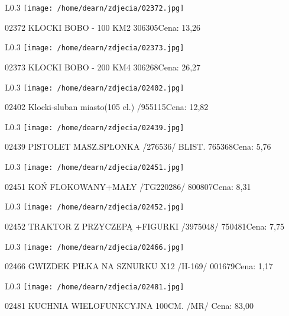 \begin{wrapfigure}{L}{0.3\textwidth}
\texttt{[image: /home/dearn/zdjecia/02372.jpg]}
\end{wrapfigure}
02372 KLOCKI BOBO - 100 KM2                           306305Cena: 13,26\newline
\begin{wrapfigure}{L}{0.3\textwidth}
\texttt{[image: /home/dearn/zdjecia/02373.jpg]}
\end{wrapfigure}
02373 KLOCKI BOBO - 200 KM4                           306268Cena: 26,27\newline
\begin{wrapfigure}{L}{0.3\textwidth}
\texttt{[image: /home/dearn/zdjecia/02402.jpg]}
\end{wrapfigure}
02402 Klocki-sluban miasto(105 el.) /955115Cena: 12,82\newline
\begin{wrapfigure}{L}{0.3\textwidth}
\texttt{[image: /home/dearn/zdjecia/02439.jpg]}
\end{wrapfigure}
02439 PISTOLET MASZ.SPŁONKA /276536/  BLIST.          765368Cena: 5,76\newline
\begin{wrapfigure}{L}{0.3\textwidth}
\texttt{[image: /home/dearn/zdjecia/02451.jpg]}
\end{wrapfigure}
02451 KOŃ FLOKOWANY+MAŁY /TG220286/                   800807Cena: 8,31\newline
\begin{wrapfigure}{L}{0.3\textwidth}
\texttt{[image: /home/dearn/zdjecia/02452.jpg]}
\end{wrapfigure}
02452 TRAKTOR Z PRZYCZEPĄ +FIGURKI /3975048/          750481Cena: 7,75\newline
\begin{wrapfigure}{L}{0.3\textwidth}
\texttt{[image: /home/dearn/zdjecia/02466.jpg]}
\end{wrapfigure}
02466 GWIZDEK PIŁKA NA SZNURKU  X12  /H-169/          001679Cena: 1,17\newline
\begin{wrapfigure}{L}{0.3\textwidth}
\texttt{[image: /home/dearn/zdjecia/02481.jpg]}
\end{wrapfigure}
02481 KUCHNIA WIELOFUNKCYJNA 100CM. /MR/      Cena: 83,00\newline
